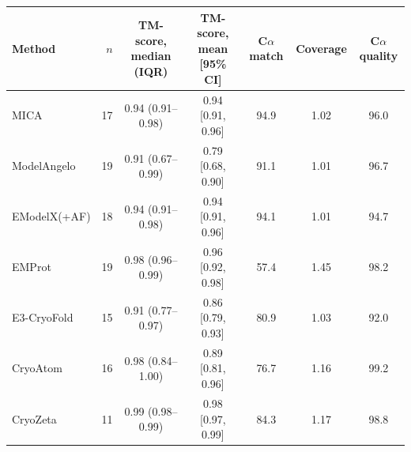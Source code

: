 \begin{tabular}{lrccccc}
\toprule
Method & $n$ & TM-score, median (IQR) & TM-score, mean [95\% CI] & C$\alpha$ match & Coverage & C$\alpha$ quality \\
\midrule
MICA & 17 & 0.94 (0.91--0.98) & 0.94 [0.91, 0.96] & 94.9 & 1.02 & 96.0 \\
ModelAngelo & 19 & 0.91 (0.67--0.99) & 0.79 [0.68, 0.90] & 91.1 & 1.01 & 96.7 \\
EModelX(+AF) & 18 & 0.94 (0.91--0.98) & 0.94 [0.91, 0.96] & 94.1 & 1.01 & 94.7 \\
EMProt & 19 & 0.98 (0.96--0.99) & 0.96 [0.92, 0.98] & 57.4 & 1.45 & 98.2 \\
E3-CryoFold & 15 & 0.91 (0.77--0.97) & 0.86 [0.79, 0.93] & 80.9 & 1.03 & 92.0 \\
CryoAtom & 16 & 0.98 (0.84--1.00) & 0.89 [0.81, 0.96] & 76.7 & 1.16 & 99.2 \\
CryoZeta & 11 & 0.99 (0.98--0.99) & 0.98 [0.97, 0.99] & 84.3 & 1.17 & 98.8 \\
\bottomrule
\end{tabular}
